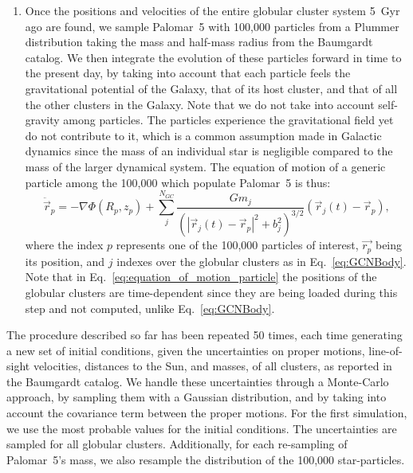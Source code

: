 \documentclass{aa}
\begin{document}
\begin{enumerate}
        \item Once the positions and velocities of the entire globular cluster system 5~Gyr ago are found, we sample Palomar~5 with 100,000 particles from a Plummer distribution taking the mass and half-mass radius from the Baumgardt catalog. We then integrate the evolution of these particles forward in time to the present day, by taking into account that each particle feels the gravitational potential of the Galaxy, that of its host cluster, and that of all the other clusters in the Galaxy. Note that we do not take into account self-gravity among particles. The particles experience the gravitational field yet do not contribute to it, which is a common assumption made in Galactic dynamics since the mass of an individual star is negligible compared to the mass of the larger dynamical system. The equation of motion of a generic particle among the 100,000 which populate Palomar~5 is thus: 
        \begin{equation}
          \ddot{\vec{r}}_p = -\nabla \Phi(R_p,z_p) + \left.\sum_{j}^{N_{GC}} \frac{Gm_j}{\left(|\vec{r}_j(t) - \vec{r}_p|^2 + b_j^2\right)^{3/2}}\right. \left(\vec{r}_j(t)- \vec{r}_p\right),
          \end{equation} \label{eq:equation_of_motion_particle} where the index $p$ represents one of the 100,000 particles of interest, $\vec{r_p}$ being its position, and $j$ indexes over the globular clusters as in Eq.~\ref{eq:GCNBody}. Note that in Eq.~\ref{eq:equation_of_motion_particle} the positions of the globular clusters are time-dependent since they are being loaded during this step and not computed, unlike Eq.~\ref{eq:GCNBody}. 

      \end{enumerate}




        The procedure described so far has been repeated 50 times, each time generating a new set of initial conditions, given the uncertainties on proper motions, line-of-sight velocities, distances to the Sun, and masses, of all clusters, as reported in the Baumgardt catalog. We handle these uncertainties through a Monte-Carlo approach, by sampling them with a Gaussian distribution, and by taking into account the covariance term between the proper motions. For the first simulation, we use the most probable values for the initial conditions. The uncertainties are sampled for all globular clusters. Additionally, for each re-sampling of Palomar~5's mass, we also resample the distribution of the 100,000 star-particles. 
\end{document}
